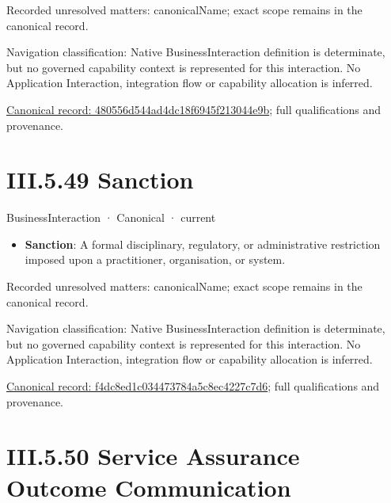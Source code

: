 {\small Recorded unresolved matters: canonicalName; exact scope remains in the canonical record.}\par
{\small Navigation classification: Native BusinessInteraction definition is determinate, but no governed capability context is represented for this interaction. No Application Interaction, integration flow or capability allocation is inferred.}\par
{\footnotesize \href{../../../../../../../../continuum/business/business-interaction/480556d544ad4dc18f6945f213044e9b.md}{Canonical record: 480556d544ad4dc18f6945f213044e9b}; full qualifications and provenance.}\par
\section*{III.5.49 Sanction}
\label{navigation:III.5.49}

\label{element:f4dc8ed1c034473784a5c8ec4227c7d6}
{\small BusinessInteraction · Canonical · current}\par

\begin{itemize}


\item \textbf{Sanction}: A formal disciplinary, regulatory, or administrative restriction imposed upon a practitioner, organisation, or system.

\end{itemize}

{\small Recorded unresolved matters: canonicalName; exact scope remains in the canonical record.}\par
{\small Navigation classification: Native BusinessInteraction definition is determinate, but no governed capability context is represented for this interaction. No Application Interaction, integration flow or capability allocation is inferred.}\par
{\footnotesize \href{../../../../../../../../continuum/business/business-interaction/f4dc8ed1c034473784a5c8ec4227c7d6.md}{Canonical record: f4dc8ed1c034473784a5c8ec4227c7d6}; full qualifications and provenance.}\par
\section*{III.5.50 Service Assurance Outcome Communication}
\label{navigation:III.5.50}


